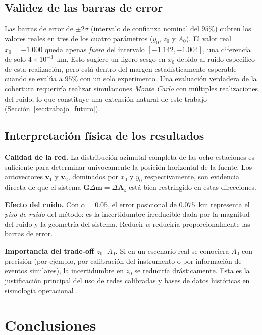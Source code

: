 \documentclass[12pt, a4paper]{article}
\begin{document}
\subsection{Validez de las barras de error}

Las barras de error de $\pm 2\sigma$ (intervalo de confianza nominal
del $95\%$) cubren los valores reales en tres de los cuatro parámetros
($y_0$, $z_0$ y $A_0$). El valor real $x_0 = -1.000$ queda apenas
\emph{fuera} del intervalo $[-1.142, -1.004]$, una diferencia de solo
$4\times 10^{-3}$~km. Esto sugiere un ligero sesgo en $x_0$ debido al
ruido específico de esta realización, pero está dentro del margen
estadísticamente esperable cuando se evalúa a $95\%$ con un solo
experimento. Una evaluación verdadera de la cobertura requeriría
realizar simulaciones \emph{Monte Carlo} con múltiples realizaciones
del ruido, lo que constituye una extensión natural de este trabajo
(Sección~\ref{sec:trabajo_futuro}).

\subsection{Interpretación física de los resultados}

\textbf{Calidad de la red.} La distribución azimutal completa de las
ocho estaciones es suficiente para determinar unívocamente la posición
horizontal de la fuente. Los autovectores $\mathbf{v}_1$ y $\mathbf{v}_2$,
dominados por $x_0$ y $y_0$ respectivamente, son evidencia directa
de que el sistema $\mathbf{G}\Delta\mathbf{m} = \Delta\mathbf{A}_z$
está bien restringido en estas direcciones.

\textbf{Efecto del ruido.} Con $\alpha = 0.05$, el error posicional
de $0.075$~km representa el \textit{piso de ruido} del método: es la
incertidumbre irreducible dada por la magnitud del ruido y la
geometría del sistema. Reducir $\alpha$ reduciría proporcionalmente
las barras de error.

\textbf{Importancia del trade-off $z_0$--$A_0$.} Si en un escenario
real se conociera $A_0$ con precisión (por ejemplo, por calibración
del instrumento o por información de eventos similares), la
incertidumbre en $z_0$ se reduciría drásticamente. Esta es la
justificación principal del uso de redes calibradas y bases de datos
históricas en sismología operacional \cite{waldhauser2000double}.

\section{Conclusiones}
\end{document}
